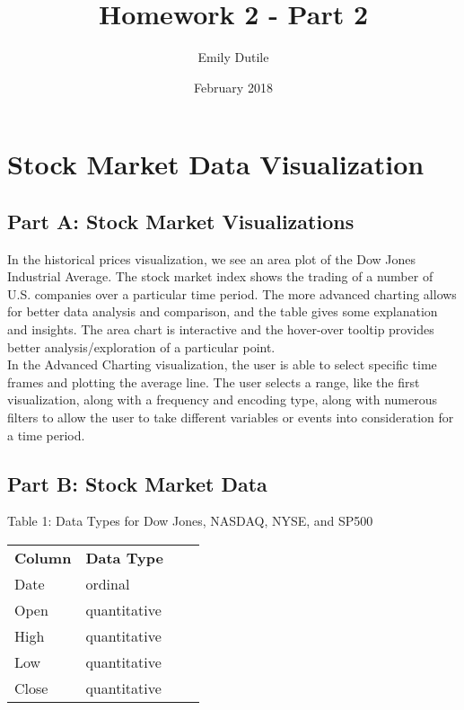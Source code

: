 \documentclass{neu_handout}
\title{Homework 2 - Part 2}
\author{Emily Dutile}
\date{February 2018}
\begin{document}
\section*{Stock Market Data Visualization}

\subsection*{Part A: Stock Market Visualizations}
In the historical prices visualization, we see an area plot of the Dow Jones Industrial Average. The stock market index shows the trading of a number of U.S. companies over a particular time period. The more advanced charting allows for better data analysis and comparison, and the table gives some explanation and insights. The area chart is interactive and the hover-over tooltip provides better analysis/exploration of a particular point.\\

In the Advanced Charting visualization, the user is able to select specific time frames and plotting the average line. The user selects a range, like the first visualization, along with a frequency and encoding type, along with numerous filters to allow the user to take different variables or events into consideration for a time period.

\subsection*{Part B: Stock Market Data}

\begin{center}
Table 1: Data Types for Dow Jones, NASDAQ, NYSE, and SP500
\end{center}
\begin{center} 
\begin{tabular}[h]{l l l l}
\textbf{Column} & \textbf{Data Type} \\
Date & ordinal \\
Open & quantitative \\ 
High & quantitative \\
Low & quantitative \\
Close & quantitative \\

\end{tabular}
\end{center}
\end{document}
